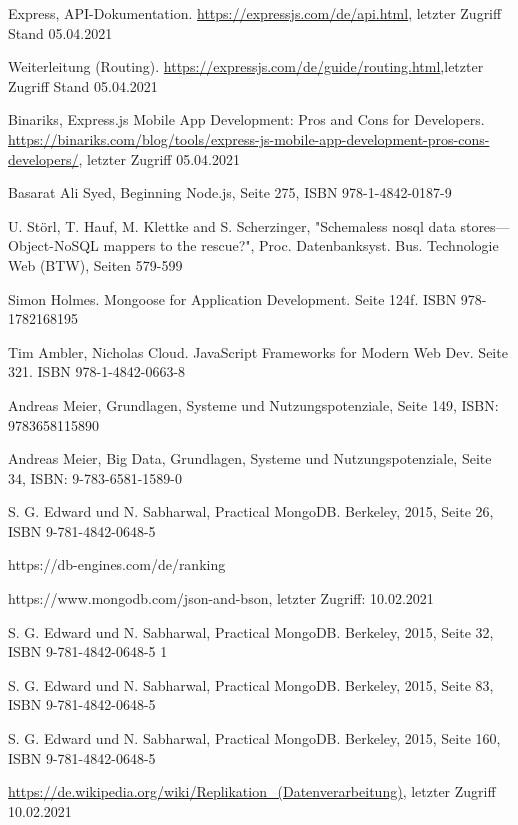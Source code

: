 \documentclass[11pt,a4paper]{article}
\begin{document}
\begin{itemize}
 Express, API-Dokumentation. \url{https://expressjs.com/de/api.html}, letzter Zugriff Stand 05.04.2021

 Weiterleitung (Routing). \url{https://expressjs.com/de/guide/routing.html},letzter Zugriff Stand 05.04.2021

 Binariks, Express.js Mobile App Development: Pros and Cons for Developers. \url{https://binariks.com/blog/tools/express-js-mobile-app-development-pros-cons-developers/}, letzter Zugriff 05.04.2021

 Basarat Ali Syed, Beginning Node.js, Seite 275, ISBN 978-1-4842-0187-9

 U. Störl, T. Hauf, M. Klettke and S. Scherzinger, "Schemaless nosql data stores—Object-NoSQL mappers to the rescue?", Proc. Datenbanksyst. Bus. Technologie Web (BTW), Seiten 579-599


 Simon Holmes. Mongoose for Application Development. Seite 124f. ISBN 978-1782168195

 Tim Ambler, Nicholas Cloud. JavaScript Frameworks for Modern Web Dev. Seite 321. ISBN 978-1-4842-0663-8


%
%
%
%

 Andreas Meier, Grundlagen, Systeme und Nutzungspotenziale, Seite 149, ISBN: 9783658115890 

 Andreas Meier, Big Data, Grundlagen, Systeme und Nutzungspotenziale, Seite 34, ISBN: 9-783-6581-1589-0 

 S. G. Edward und N. Sabharwal, Practical MongoDB. Berkeley, 2015, Seite 26, ISBN 9-781-4842-0648-5 

 https://db-engines.com/de/ranking 

 https://www.mongodb.com/json-and-bson, letzter Zugriff: 10.02.2021
 
 S. G. Edward und N. Sabharwal, Practical MongoDB. Berkeley, 2015, Seite 32, ISBN 9-781-4842-0648-5 
1

 S. G. Edward und N. Sabharwal, Practical MongoDB. Berkeley, 2015, Seite 83, ISBN 9-781-4842-0648-5 

 S. G. Edward und N. Sabharwal, Practical MongoDB. Berkeley, 2015, Seite 160, ISBN 9-781-4842-0648-5 

 \url{https://de.wikipedia.org/wiki/Replikation_(Datenverarbeitung)}, letzter Zugriff 10.02.2021


\end{itemize}
\end{document}
